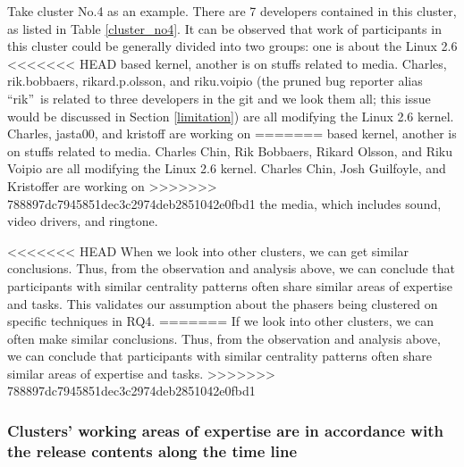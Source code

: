 \documentclass[conference]{IEEEtran}
\begin{document}

Take cluster No.4 as an example. There are 7 developers
contained in this cluster, as listed in Table \ref{cluster_no4}.
It can be observed that work of participants in this cluster
could be generally divided into two groups: one is about the Linux 2.6
<<<<<<< HEAD
based kernel, another is on stuffs related to media. Charles, rik.bobbaers, rikard.p.olsson, and riku.voipio (the pruned bug reporter alias \textquotedblleft rik\textquotedblright \ is related to three developers in the git and we look them all; this issue would be discussed in Section \ref{limitation}) are all modifying the Linux 2.6
kernel. Charles, jasta00, and kristoff are working on
=======
based kernel, another is on stuffs related to media. Charles Chin, Rik
Bobbaers, Rikard Olsson, and Riku Voipio are all modifying the Linux 2.6
kernel. Charles Chin, Josh Guilfoyle, and Kristoffer are working on
>>>>>>> 788897dc7945851dec3c2974deb2851042e0fbd1
the media, which includes sound, video drivers, and
ringtone. 

<<<<<<< HEAD
When we look into other clusters, we can get similar conclusions.
Thus, from the observation and analysis above, we can conclude that
participants with similar centrality patterns often share similar
areas of expertise and tasks. This validates our assumption about the phasers being clustered on specific techniques in RQ4.
=======
If we look into other clusters, we can often make similar conclusions.
Thus, from the observation and analysis above, we can conclude that
participants with similar centrality patterns often share similar
areas of expertise and tasks.
>>>>>>> 788897dc7945851dec3c2974deb2851042e0fbd1

\subsubsection{Clusters' working areas of expertise are in accordance with the release contents along the time line}
\end{document}
